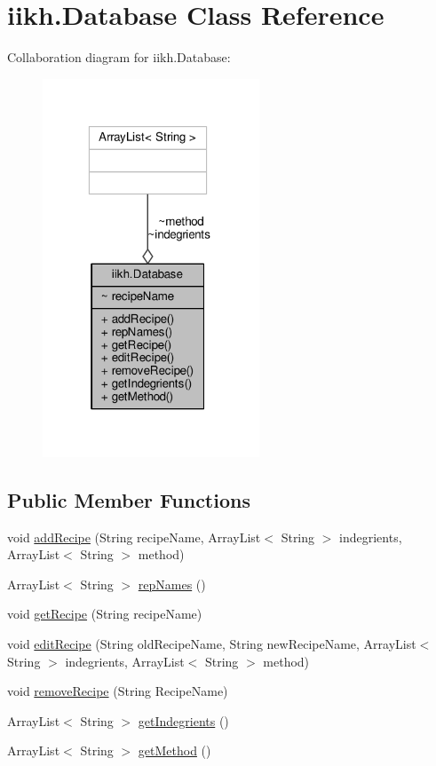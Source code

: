 \hypertarget{classiikh_1_1Database}{\section{iikh.\-Database Class Reference}
\label{classiikh_1_1Database}
}


Collaboration diagram for iikh.\-Database\-:
\nopagebreak
\begin{figure}[H]
\begin{center}
\leavevmode
\includegraphics[width=183pt]{classiikh_1_1Database__coll__graph}
\end{center}
\end{figure}
\subsection*{Public Member Functions}
\begin{DoxyCompactItemize}
\item 
void \hyperlink{classiikh_1_1Database_a3126cde12781a55dfc8898452843aca5}{add\-Recipe} (String recipe\-Name, Array\-List$<$ String $>$ indegrients, Array\-List$<$ String $>$ method)
\item 
Array\-List$<$ String $>$ \hyperlink{classiikh_1_1Database_a3cae2850a17856de5310e386d6d0a496}{rep\-Names} ()
\item 
void \hyperlink{classiikh_1_1Database_a0515f744922af9d3cef297a3d66fcecc}{get\-Recipe} (String recipe\-Name)
\item 
void \hyperlink{classiikh_1_1Database_a60b7b747492c6ef9dd01632750b817f3}{edit\-Recipe} (String old\-Recipe\-Name, String new\-Recipe\-Name, Array\-List$<$ String $>$ indegrients, Array\-List$<$ String $>$ method)
\item 
void \hyperlink{classiikh_1_1Database_ae511be60eac7e23f273b4afcb92ec7b7}{remove\-Recipe} (String Recipe\-Name)
\item 
Array\-List$<$ String $>$ \hyperlink{classiikh_1_1Database_a17e77feed3e9e1ac003aded0d9a449a8}{get\-Indegrients} ()
\item 
Array\-List$<$ String $>$ \hyperlink{classiikh_1_1Database_a3a7aeca4a1ed5e510a8801a389e28e29}{get\-Method} ()
\end{DoxyCompactItemize}


